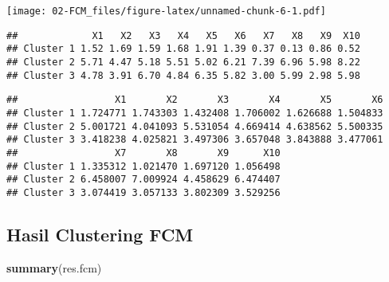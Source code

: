 \documentclass[
]{elegantbook}
\newenvironment{Shaded}{\begin{snugshade}}{\end{snugshade}}
\newcommand{\FunctionTok}[1]{\textcolor[rgb]{0.13,0.29,0.53}{\textbf{#1}}}
\newcommand{\NormalTok}[1]{#1}
\newcommand{\SpecialCharTok}[1]{\textcolor[rgb]{0.81,0.36,0.00}{\textbf{#1}}}
\begin{document}
\texttt{[image: 02-FCM\_files/figure-latex/unnamed-chunk-6-1.pdf]}

\begin{Shaded}
\end{Shaded}

\begin{verbatim}
##             X1   X2   X3   X4   X5   X6   X7   X8   X9  X10
## Cluster 1 1.52 1.69 1.59 1.68 1.91 1.39 0.37 0.13 0.86 0.52
## Cluster 2 5.71 4.47 5.18 5.51 5.02 6.21 7.39 6.96 5.98 8.22
## Cluster 3 4.78 3.91 6.70 4.84 6.35 5.82 3.00 5.99 2.98 5.98
\end{verbatim}

\begin{Shaded}
\end{Shaded}

\begin{verbatim}
##                 X1       X2       X3       X4       X5       X6
## Cluster 1 1.724771 1.743303 1.432408 1.706002 1.626688 1.504833
## Cluster 2 5.001721 4.041093 5.531054 4.669414 4.638562 5.500335
## Cluster 3 3.418238 4.025821 3.497306 3.657048 3.843888 3.477061
##                 X7       X8       X9      X10
## Cluster 1 1.335312 1.021470 1.697120 1.056498
## Cluster 2 6.458007 7.009924 4.458629 6.474407
## Cluster 3 3.074419 3.057133 3.802309 3.529256
\end{verbatim}

\hypertarget{hasil-clustering-fcm}{%
\subsection{Hasil Clustering FCM}\label{hasil-clustering-fcm}}

\begin{Shaded}
\begin{Highlighting}[]
\FunctionTok{summary}\NormalTok{(res.fcm)}
\end{Highlighting}
\end{Shaded}
\end{document}
